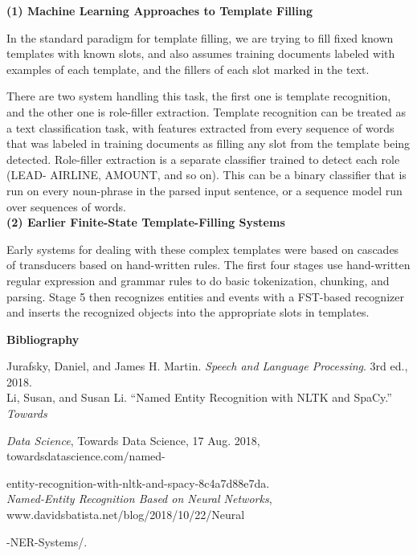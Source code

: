 \documentclass[a4paper,12pt]{report}
\begin{document}
\noindent
\textbf{(1) Machine Learning Approaches to Template Filling}

\noindent
In the standard paradigm for template filling, we are trying to fill fixed known templates with known slots, and also assumes training documents labeled with examples of each template, and the fillers of each slot marked in the text.

\noindent
There are two system handling this task, the first one is template recognition, and the other one is role-filler extraction. Template recognition can be treated as a text classification task, with features extracted from every sequence of words that was labeled
in training documents as filling any slot from the template being detected. Role-filler extraction is a separate classifier trained to detect each role (LEAD- AIRLINE, AMOUNT, and so on). This can be a binary classifier that is run on every noun-phrase in the parsed input sentence, or a sequence model run over sequences of words.\\

\noindent
\textbf{(2) Earlier Finite-State Template-Filling Systems}

\noindent
Early systems for dealing with these complex templates were based on cascades of transducers based on hand-written rules. The first four stages use hand-written regular expression and grammar rules to
do basic tokenization, chunking, and parsing. Stage 5 then recognizes entities and events with a FST-based recognizer and inserts the recognized objects into the appropriate slots in templates. \\

\pagebreak
\begin{center}
\textbf{Bibliography}
\end{center}

\noindent
Jurafsky, Daniel, and James H. Martin. \textit{Speech and Language Processing}. 3rd ed., 2018.\\

\noindent
Li, Susan, and Susan Li. “Named Entity Recognition with NLTK and SpaCy.” \textit{Towards} 

\textit{Data Science}, Towards Data Science, 17 Aug. 2018, towardsdatascience.com/named-

entity-recognition-with-nltk-and-spacy-8c4a7d88e7da.\\


\noindent
\textit{Named-Entity Recognition Based on Neural Networks}, www.davidsbatista.net/blog/2018/10/22/Neural

-NER-Systems/.
\end{document}
